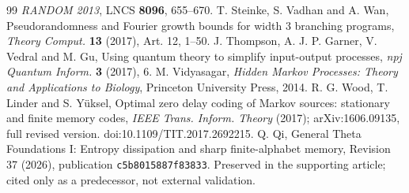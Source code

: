 \begin{thebibliography}{99}
\emph{RANDOM 2013}, LNCS \textbf{8096}, 655--670.
 T. Steinke, S. Vadhan and A. Wan,
Pseudorandomness and Fourier growth bounds for width 3 branching programs,
\emph{Theory Comput.} \textbf{13} (2017), Art. 12, 1--50.
 J. Thompson, A. J. P. Garner, V. Vedral and M. Gu,
Using quantum theory to simplify input-output processes,
\emph{npj Quantum Inform.} \textbf{3} (2017), 6.
 M. Vidyasagar,
\emph{Hidden Markov Processes: Theory and Applications to Biology},
Princeton University Press, 2014.
 R. G. Wood, T. Linder and S. Y\"uksel,
Optimal zero delay coding of Markov sources: stationary and finite memory codes,
\emph{IEEE Trans. Inform. Theory} (2017);
arXiv:1606.09135, full revised version.
doi:10.1109/TIT.2017.2692215.
 Q. Qi,
General Theta Foundations I: Entropy dissipation and sharp finite-alphabet memory,
Revision 37 (2026), publication \texttt{c5b8015887f83833}.
Preserved in the supporting article; cited only as a predecessor, not external validation.
\end{thebibliography}
